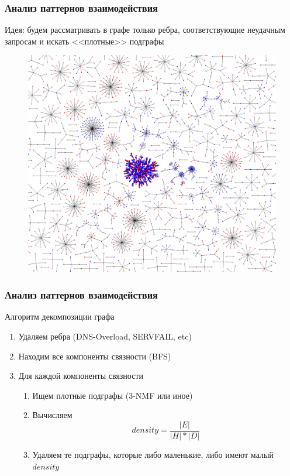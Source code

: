 \documentclass[12pt,pdf,hyperref={unicode}]{beamer}
\begin{document}
\begin{frame}
\frametitle{Анализ паттернов взаимодействия}
Идея: будем рассматривать в графе только ребра, соответствующие неудачным запросам и искать <<плотные>> подграфы
\begin{figure}[H]
	\centering
	\includegraphics[scale=0.13]{img/fail-graph.png}
\end{figure}
\end{frame}

\begin{frame}
\frametitle{Анализ паттернов взаимодействия}
Алгоритм декомпозиции графа
\begin{enumerate}
	\item Удаляем ребра (DNS-Overload, SERVFAIL, etc)
	\item Находим все компоненты связности (BFS)
	\item Для каждой компоненты связности
	\begin{enumerate}
		\item Ищем плотные подграфы (3-NMF или иное)
		\item Вычисляем $$density = \frac{|E|}{|H|*|D|}$$
		\item Удаляем те подграфы, которые либо маленькие, либо имеют малый $density$
	\end{enumerate}
\end{enumerate}
\end{frame}
\end{document}
